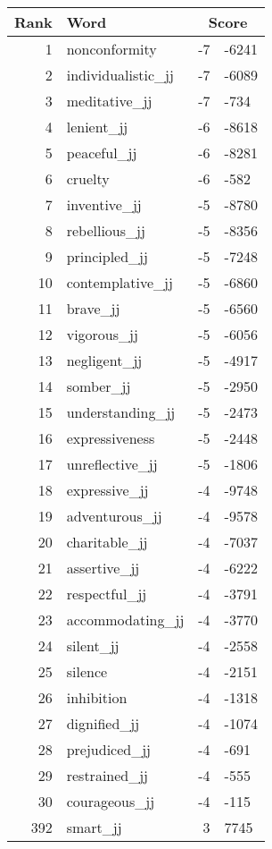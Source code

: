 \begin{longtable}[!htbp]{| rlr@{.}l |}
    \hline
    \textbf{Rank} & \textbf{Word} & \multicolumn{2}{c|}{\textbf{Score}} \\
    \hline
    \endhead
    1 & nonconformity & -7 & -6241 \\
    2 & individualistic\_jj & -7 & -6089 \\
    3 & meditative\_jj & -7 & -734 \\
    4 & lenient\_jj & -6 & -8618 \\
    5 & peaceful\_jj & -6 & -8281 \\
    6 & cruelty & -6 & -582 \\
    7 & inventive\_jj & -5 & -8780 \\
    8 & rebellious\_jj & -5 & -8356 \\
    9 & principled\_jj & -5 & -7248 \\
    10 & contemplative\_jj & -5 & -6860 \\
    11 & brave\_jj & -5 & -6560 \\
    12 & vigorous\_jj & -5 & -6056 \\
    13 & negligent\_jj & -5 & -4917 \\
    14 & somber\_jj & -5 & -2950 \\
    15 & understanding\_jj & -5 & -2473 \\
    16 & expressiveness & -5 & -2448 \\
    17 & unreflective\_jj & -5 & -1806 \\
    18 & expressive\_jj & -4 & -9748 \\
    19 & adventurous\_jj & -4 & -9578 \\
    20 & charitable\_jj & -4 & -7037 \\
    21 & assertive\_jj & -4 & -6222 \\
    22 & respectful\_jj & -4 & -3791 \\
    23 & accommodating\_jj & -4 & -3770 \\
    24 & silent\_jj & -4 & -2558 \\
    25 & silence & -4 & -2151 \\
    26 & inhibition & -4 & -1318 \\
    27 & dignified\_jj & -4 & -1074 \\
    28 & prejudiced\_jj & -4 & -691 \\
    29 & restrained\_jj & -4 & -555 \\
    30 & courageous\_jj & -4 & -115 \\
    392 & smart\_jj & 3 & 7745 \\

\end{longtable}
